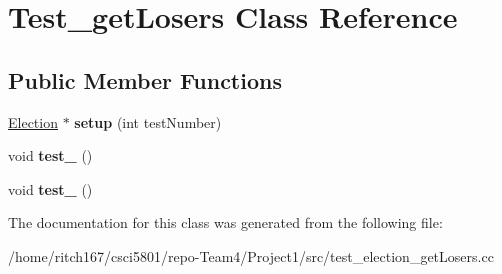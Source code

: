 \hypertarget{classTest__getLosers}{}\section{Test\+\_\+get\+Losers Class Reference}
\label{classTest__getLosers}
\subsection*{Public Member Functions}
\begin{DoxyCompactItemize}
\item 
\mbox{\label{classTest__getLosers_a22e1183de79914d45b5a2d0fb5c5e875}} 
\hyperlink{classElection}{Election} $\ast$ {\bfseries setup} (int test\+Number)
\item 
\mbox{\label{classTest__getLosers_a770cc0f541656823fa1680c4739f6e03}} 
void {\bfseries test\+\_} ()
\item 
\mbox{\label{classTest__getLosers_af71a0293aa58ae346943f0ed1c6b08e5}} 
void {\bfseries test\+\_} ()
\end{DoxyCompactItemize}


The documentation for this class was generated from the following file\+:\begin{DoxyCompactItemize}
\item 
/home/ritch167/csci5801/repo-\/\+Team4/\+Project1/src/test\+\_\+election\+\_\+get\+Losers.\+cc\end{DoxyCompactItemize}
